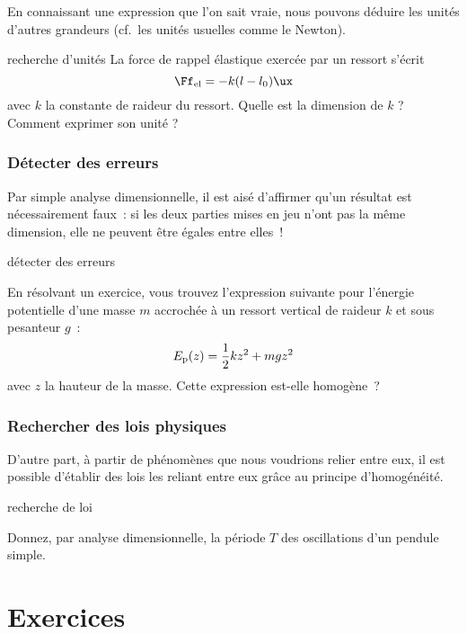 \documentclass[../main/main.tex]{subfiles}
\begin{document}
En connaissant une expression que l'on sait vraie, nous pouvons déduire les
unités d'autres grandeurs (cf.\ les unités usuelles comme le Newton).

\begin{exem}[label=exem:homounit]{recherche d'unités}
	La force de rappel élastique exercée par un ressort s'écrit
	\[\Ff_{\rm el} = -k(l-l_0)\ux\]
	avec $k$ la constante de raideur du ressort. Quelle est la dimension de $k$
	? Comment exprimer son unité ?
	\tcblower
	\vspace{3cm}
\end{exem}

\subsubsection{Détecter des erreurs}

Par simple analyse dimensionnelle, il est aisé d'affirmer qu'un résultat est
nécessairement faux~: si les deux parties mises en jeu n'ont pas la même
dimension, elle ne peuvent être égales entre elles~!

\begin{exem}[label=exem:homoerr]{détecter des erreurs}

	En résolvant un exercice, vous trouvez l'expression suivante pour l'énergie
	potentielle d'une masse $m$ accrochée à un ressort vertical de raideur $k$
	et sous pesanteur $g$~:
	\[E_{\rm p} (z) = \frac{1}{2}kz^2 + mgz^2\]
	avec $z$ la hauteur de la masse. Cette expression est-elle homogène~?
	\tcblower
	\vspace{6cm}
\end{exem}

\subsubsection{Rechercher des lois physiques}
D'autre part, à partir de phénomènes que nous voudrions relier entre eux, il est
possible d'établir des lois les reliant entre eux grâce au principe
d'homogénéité.

\begin{exem}[label=exem:homoloi]{recherche de loi}

	Donnez, par analyse dimensionnelle, la période $T$ des oscillations d'un
	pendule simple.
	\tcblower
	\vspace{6cm}
\end{exem}

\newpage
\section{Exercices}
\end{document}

